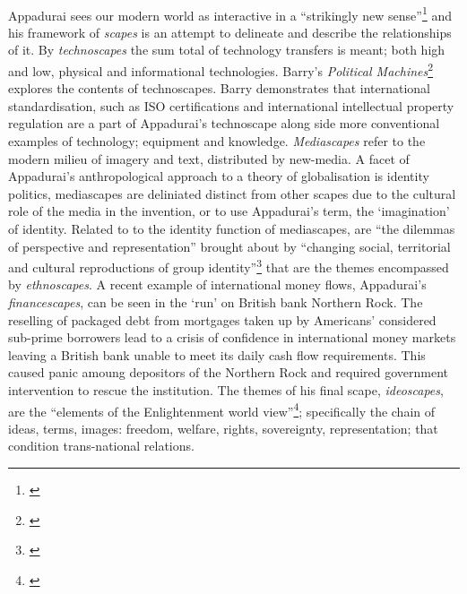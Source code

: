 \documentclass{article}
\begin{document}
\paragraph{}Appadurai sees our modern world as interactive in a ``strikingly new sense''\footnote{\cite[p.27]{Appadurai:1996lp}} and his framework of \emph{scapes} is an attempt to delineate and describe the relationships of it. By \emph{technoscapes} the sum total of technology transfers is meant; both high and low, physical and informational technologies. Barry's \emph{Political Machines}\footnote{\cite[Ch.2]{Barry:2001ff}} explores the contents of technoscapes. Barry demonstrates that international standardisation, such as ISO certifications and international intellectual property regulation are a part of Appadurai's technoscape along side more conventional examples of technology; equipment and knowledge. \emph{Mediascapes} refer to the modern milieu of imagery and text, distributed by new-media. A facet of Appadurai's anthropological approach to a theory of globalisation is identity politics, mediascapes are deliniated distinct from other scapes due to the cultural role of the media in the invention, or to use Appadurai's term, the `imagination' of identity. Related to to the identity function of mediascapes, are ``the dilemmas of perspective and representation'' brought about by ``changing social, territorial and cultural reproductions of group identity''\footnote{\cite[p.48]{Appadurai:1996lp}} that are the themes encompassed by \emph{ethnoscapes}. A recent example of international money flows, Appadurai's \emph{financescapes}, can be seen in the `run' on British bank Northern Rock. The reselling of packaged debt from mortgages taken up by Americans' considered sub-prime borrowers lead to a crisis of confidence in international money markets leaving a British bank unable to meet its daily cash flow requirements. This caused panic amoung depositors of the Northern Rock and required government intervention to rescue the institution. The themes of his final scape, \emph{ideoscapes}, are the ``elements of the Enlightenment world view''\footnote{\cite[p.36]{Appadurai:1996lp}}; specifically the chain of ideas, terms, images: freedom, welfare, rights, sovereignty, representation; that condition trans-national relations.
\end{document}
